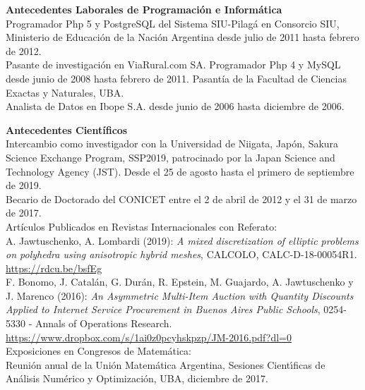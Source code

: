 \textbf{Antecedentes Laborales de Programaci\'on e Inform\'atica}\\[6pt]
Programador Php 5 y PostgreSQL del Sistema SIU-Pilag\'a en Consorcio SIU, Ministerio de Educaci\'on de la Naci\'on Argentina desde julio de 2011 hasta febrero de 2012.\\[4pt]
Pasante de investigaci\'on en ViaRural.com SA. Programador
Php 4 y MySQL desde junio de 2008 
hasta febrero de 2011. Pasant\'ia de la Facultad de Ciencias Exactas y Naturales, UBA.\\[4pt]
Analista de Datos en Ibope S.A. desde junio de 2006 hasta diciembre de 2006.

\textbf{Antecedentes Cient\'ificos}\\[6pt]
Intercambio como investigador con la Universidad de Niigata, Jap\'on,
Sakura Science Exchange Program, SSP2019, patrocinado por
la Japan Science and Technology Agency (JST). Desde el 25 de agosto
hasta el primero de septiembre de 2019.\\[6pt]
Becario de Doctorado del CONICET entre el 2 de abril de 2012 y el 31 de marzo de 2017.\\[6pt]
Art\'iculos Publicados en Revistas Internacionales con Referato:\\[6pt]
A. Jawtuschenko, A. Lombardi (2019): 
\emph{A mixed discretization of elliptic problems on polyhedra using anisotropic hybrid meshes},
CALCOLO, CALC-D-18-00054R1.
\href{http://em.rdcu.be/wf/click?upn=lMZy1lernSJ7apc5DgYM8RtiRnX98cgbvE81KQGn5tE-3D_-2Fq09Vpjrycd-2BAOhvYDidHaHWLaG8WMoWs1lRs2mKTzqCwYNFhlGtplH8kb8yUCOrEFESCWAEP1qrD-2BJgg09nu-2Fz61XDXWYdppeXx4JzFRLvI-2FYyjZMrov-2FaxFxLv9MaqfC-2BjYanB-2FkLIArphbTB7hvuq-2BJ-2BP0dpoVrgh2NJYizQcMbyo6AA8jcx6RYsWvb3RMk9c7QXTqmoLaHKr8Xg6yK2lC1IxrYwuPPxXUxfxXQc0WAqTO-2Bg-2F9P-2BWkhJXyogoqkg5GNjl1KqQhJV5xi014g-3D-3D}{\color{blue}https://rdcu.be/bsfEg}
\\[4pt]
F. Bonomo, J. Catal\'an, G. Dur\'an, R. Epstein, M. Guajardo, A. Jawtuschenko y J. Marenco (2016):
\emph{An Asymmetric Multi-Item Auction with Quantity Discounts Applied to Internet 
Service Procurement in Buenos Aires Public Schools}, 
0254-5330 - Annals of Operations Research.\\
\href{https://www.dropbox.com/s/1ai0z0pcyhskpzp/JM-2016.pdf?dl=0}{\color{blue}https://www.dropbox.com/s/1ai0z0pcyhskpzp/JM-2016.pdf?dl=0}\\[6pt]
Exposiciones en Congresos de Matem\'atica:\\[6pt]
Reuni\'on anual de la Uni\'on Matem\'atica Argentina, Sesiones Cient\'{\i}ficas
de An\'alisis Num\'erico y Optimizaci\'on, UBA, diciembre de 2017.\\[4pt]


